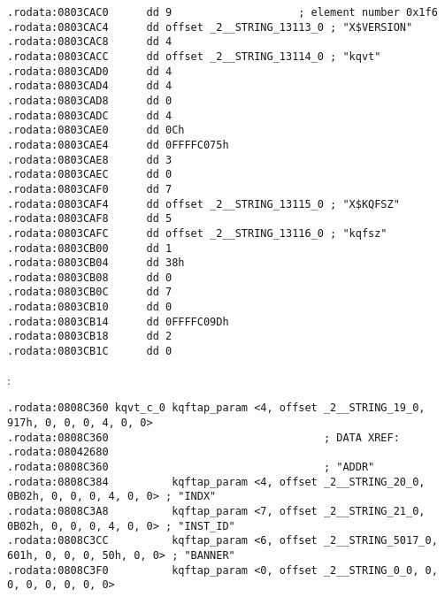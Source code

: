\begin{lstlisting}[caption=kqf.o]
.rodata:0803CAC0      dd 9                    ; element number 0x1f6
.rodata:0803CAC4      dd offset _2__STRING_13113_0 ; "X$VERSION"
.rodata:0803CAC8      dd 4
.rodata:0803CACC      dd offset _2__STRING_13114_0 ; "kqvt"
.rodata:0803CAD0      dd 4
.rodata:0803CAD4      dd 4
.rodata:0803CAD8      dd 0
.rodata:0803CADC      dd 4
.rodata:0803CAE0      dd 0Ch
.rodata:0803CAE4      dd 0FFFFC075h
.rodata:0803CAE8      dd 3
.rodata:0803CAEC      dd 0
.rodata:0803CAF0      dd 7
.rodata:0803CAF4      dd offset _2__STRING_13115_0 ; "X$KQFSZ"
.rodata:0803CAF8      dd 5
.rodata:0803CAFC      dd offset _2__STRING_13116_0 ; "kqfsz"
.rodata:0803CB00      dd 1
.rodata:0803CB04      dd 38h
.rodata:0803CB08      dd 0
.rodata:0803CB0C      dd 7
.rodata:0803CB10      dd 0
.rodata:0803CB14      dd 0FFFFC09Dh
.rodata:0803CB18      dd 2
.rodata:0803CB1C      dd 0
\end{lstlisting}


 :

\begin{lstlisting}[caption=kqf.o]
.rodata:0808C360 kqvt_c_0 kqftap_param <4, offset _2__STRING_19_0, 917h, 0, 0, 0, 4, 0, 0>
.rodata:0808C360                                  ; DATA XREF: .rodata:08042680
.rodata:0808C360                                  ; "ADDR"
.rodata:0808C384          kqftap_param <4, offset _2__STRING_20_0, 0B02h, 0, 0, 0, 4, 0, 0> ; "INDX"
.rodata:0808C3A8          kqftap_param <7, offset _2__STRING_21_0, 0B02h, 0, 0, 0, 4, 0, 0> ; "INST_ID"
.rodata:0808C3CC          kqftap_param <6, offset _2__STRING_5017_0, 601h, 0, 0, 0, 50h, 0, 0> ; "BANNER"
.rodata:0808C3F0          kqftap_param <0, offset _2__STRING_0_0, 0, 0, 0, 0, 0, 0, 0>
\end{lstlisting}

